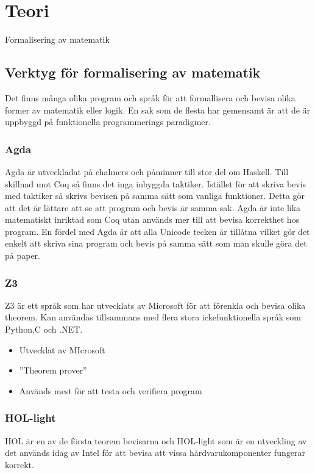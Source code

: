 \section{Teori}
Formalisering av matematik

\subsection{Verktyg för formalisering av matematik}
Det finns många olika program och språk för att formallisera och bevisa
olika former av matematik eller logik. En sak som de flesta har gemensamt är
att de är uppbyggd på funktionella programmerings paradigmer.

\subsubsection{Agda}
Agda är utveckladat på chalmers och påminner till stor del om Haskell. Till
skillnad mot Coq så finns det inga inbyggda taktiker. Istället för att skriva
bevis med taktiker så skrivs bevisen på samma sätt som vanliga funktioner.
Detta gör att det är lättare att se att program och bevis är samma sak. Agda är
inte lika matematiskt inriktad som Coq utan används mer till att bevisa
korrekthet hos program. En fördel med Agda är att alla Unicode tecken är
tillåtna vilket gör det enkelt att skriva sina program och bevis på samma sätt
som man skulle göra det på paper.

\subsubsection{Z3}
Z3 är ett språk som har utvecklats av Microsoft för att förenkla och bevisa
olika theorem. Kan användas tillsammans med flera stora ickefunktionella språk
som Python,C och .NET.

\begin{itemize}
  \item Utvecklat av MIcrosoft
  \item ''Theorem prover''
  \item Används mest för att testa och verifiera program
\end{itemize}

\subsubsection{HOL-light}
HOL är en av de första teorem bevisarna och HOL-light som är en utveckling av
det används idag av Intel för att bevisa att vissa hårdvarukomponenter fungerar
korrekt.

